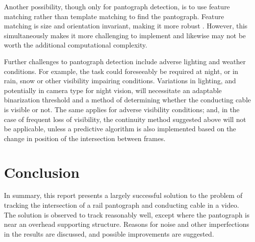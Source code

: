 Another possibility, though only for pantograph detection, is to use feature matching rather than template matching to find the pantograph. Feature matching is size and orientation invariant, making it more robust \cite{opencv_fm}. However, this simultaneously makes it more challenging to implement and likewise may not be worth the additional computational complexity.

Further challenges to pantograph detection include adverse lighting and weather conditions. For example, the task could foreseeably be required at night, or in rain, snow or other visibility impairing conditions. Variations in lighting, and potentially in camera type for night vision, will necessitate an adaptable binarization threshold and a method of determining whether the conducting cable is visible or not. The same applies for adverse visibility conditions; and, in the case of frequent loss of visibility, the continuity method suggested above will not be applicable, unless a predictive algorithm is also implemented based on the change in position of the intersection between frames.

\section{Conclusion}

In summary, this report presents a largely successful solution to the problem of tracking the intersection of a rail pantograph and conducting cable in a video. The solution is observed to track reasonably well, except where the pantograph is near an overhead supporting structure. Reasons for noise and other imperfections in the results are discussed, and possible improvements are suggested.

